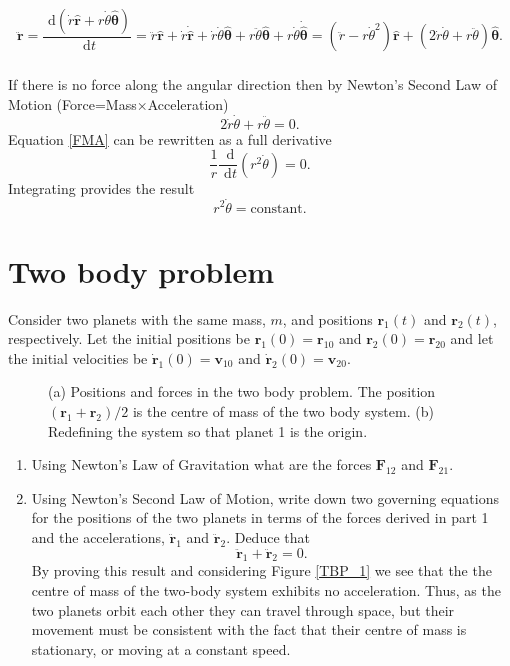 \documentclass[]{article}
\newcounter{ItemCounter}
\newcommand{\bb}{\begin{equation}}
\newcommand{\ee}{\end{equation}}
\newcommand{\rd}{\text{ d}}
\newcommand{\fig}[1]{Figure \ref{#1}}
\newcommand{\ttp}{.45\textwidth}
\renewcommand{\l}{\left(}
\renewcommand{\r}{\right)}
\begin{document}
\begin{Answ}
\subsubsection{}
\bb
\ddot{\bm{r}}=\frac{\rd \l \dot{r}\hat{\bm{r}}+r\dot{\theta}\hat{\bm{\theta}} \r}{\rd t}=\ddot{r}\hat{\bm{r}}+\dot{r}\dot{\hat{\bm{r}}}+\dot{r}\dot{\theta}\hat{\bm{\theta}}+r\ddot{\theta}\hat{\bm{\theta}}+r\dot{\theta}\dot{\hat{\bm{\theta}}}=\l \ddot{r}-r\dot{\theta}^2\r\hat{\bm{r}}+\l 2\dot{r}\dot{\theta}+r\ddot{\theta}\r\hat{\bm{\theta}}.
\ee
\subsubsection{}
If there is no force along the angular direction then by Newton's Second Law of Motion (Force=Mass$\times$Acceleration)
\bb
2\dot{r}\dot{\theta}+r\ddot{\theta}=0.\label{FMA}
\ee
Equation \eqref{FMA} can be rewritten as a full derivative
\bb
\frac{1}{r}\frac{\rd}{\rd t}\l r^2\dot{\theta}\r=0.
\ee
Integrating provides the result
\bb
r^2\dot{\theta}=\textrm{constant}.
\ee
\end{Answ}
\section{Two body problem}
Consider two planets with the same mass, $m$, and positions $\bm{r}_1(t)$ and $\bm{r}_2(t)$, respectively. Let the initial positions be $\bm{r}_1(0)=\bm{r}_{10}$ and $\bm{r}_2(0)=\bm{r}_{20}$ and let the initial velocities be $\dot{\bm{r}}_1(0)=\bm{v}_{10}$ and $\dot{\bm{r}}_2(0)=\bm{v}_{20}$.
\begin{figure}[h!!!tb]
\centering
{}
\caption{\label{Two_body_problem} (a) Positions and forces in the two body problem. The position $(\bm{r}_1+\bm{r}_2)/2$ is the centre of mass of the two body system. (b) Redefining the system so that planet 1 is the origin.}
\end{figure}
\begin{enumerate}
\item Using Newton's Law of Gravitation what are the forces $\bm{F}_{12}$ and $\bm{F}_{21}$.
\item \label{Planet_N2L}Using Newton's Second Law of Motion, write down two governing equations for the positions of the two planets in terms of the forces derived in part 1 and the accelerations, $\ddot{\bm{r}}_1$ and $\ddot{\bm{r}}_2$. Deduce that
\bb
\ddot{\bm{r}}_1+\ddot{\bm{r}}_2=0.
\ee
By proving this result and considering \fig{TBP_1} we see that the the  centre  of  mass  of  the  two-body  system  exhibits  no acceleration. Thus, as the two planets orbit each other they can travel through space, but their movement must be consistent with the fact that their centre of mass is stationary, or moving at a constant speed.
\setcounter{ItemCounter}{\value{enumi}}
\end{enumerate}
\end{document}
